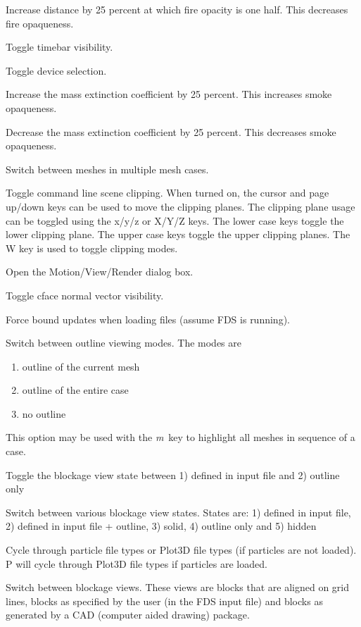 \documentclass[11pt,twoside]{book}
\newcommand{\kitem}[1]{\item[{\bf {\tt #1 \  }} \hfill]}
\begin{document}
\kitem{K}Increase distance by 25 percent at which fire opacity is one half. This decreases fire opaqueness.

\kitem{CTRL k}Toggle timebar visibility.

\kitem{ALT k}Toggle device selection.

\kitem{l}Increase the mass extinction coefficient by 25 percent.  This increases smoke opaqueness.

\kitem{L, ALT l}Decrease the mass extinction coefficient by 25 percent.  This decreases smoke opaqueness.

\kitem{m}Switch between meshes in multiple mesh cases.

\kitem{M}Toggle command line scene clipping.  When turned on, the
cursor and page up/down keys can be used to move the clipping planes.
The clipping plane usage can be toggled using the x/y/z or X/Y/Z keys.
The lower case keys toggle the lower clipping plane.  The upper case
keys toggle the upper clipping planes.
The W key is used to toggle clipping modes.

\kitem{ALT m}Open the Motion/View/Render dialog box.

\kitem{n}Toggle cface normal vector visibility.

\kitem{N}Force bound updates when loading files (assume FDS is running).

\kitem{o}Switch between outline viewing modes. The modes are
\begin{enumerate}
\item outline of the current mesh
\item outline of the entire case
\item no outline
\end{enumerate}
This option may be used with the {\em m}\ key to highlight all meshes in sequence of a case.

\kitem{O}Toggle the blockage view state between 1) defined in input file and 2) outline only

\kitem{ALT o}Switch between various blockage view states.  States are:
1) defined in input file,
2) defined in input file + outline,
3) solid,
4) outline only and
5) hidden

\kitem{p, P}Cycle through particle file types or Plot3D file types (if particles are not loaded).
P will cycle through Plot3D file types if particles are loaded.

\kitem{q}Switch between blockage views.  These views are blocks
that are aligned on grid lines, blocks as specified by the user
(in the FDS input file) and blocks as generated by a CAD (computer
aided drawing) package.
\end{document}
